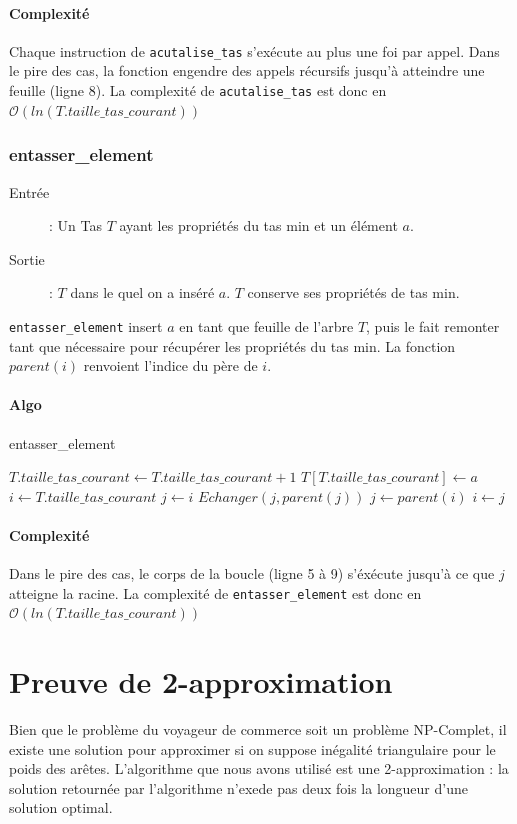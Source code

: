 \documentclass[a4paper,11pt]{article}
\begin{document}
\paragraph*{Complexité}
Chaque instruction de \texttt{acutalise\_tas} s’exécute au plus une foi par appel. Dans le pire des cas, la fonction engendre des appels récursifs jusqu’à atteindre une feuille (ligne 8). La complexité de \texttt{acutalise\_tas} est donc en $\mathcal{O}(ln(T.taille\_tas\_courant))$
\subsubsection*{entasser\_element}
\begin{description}
\item[Entrée] :  Un \textsf{Tas} $T$ ayant les propriétés du tas min et un élément $a$.
\item[Sortie] :  $T$ dans le quel on a inséré $a$. $T$ conserve ses propriétés de tas min.
\end{description}
\texttt{entasser\_element} insert $a$ en tant que feuille de l'arbre $T$, puis le fait remonter tant que nécessaire pour récupérer les propriétés du tas min.
La fonction $parent(i)$ renvoient l'indice du père de $i$.
\paragraph*{Algo}
\begin{algorithm}
\caption{entasser\_element}
\begin{algorithmic}[1]
\STATE $T.taille\_tas\_courant \leftarrow T.taille\_tas\_courant + 1$
\STATE $T\left[T.taille\_tas\_courant\right] \leftarrow a$
\STATE $i \leftarrow T.taille\_tas\_courant$
\STATE $j \leftarrow i$
\STATE $Echanger(j, parent(j))$
\STATE $j \leftarrow parent(i)$
\STATE $i \leftarrow j$
\ENDWHILE
\end{algorithmic}
\end{algorithm}
\paragraph*{Complexité}
Dans le pire des cas, le corps de la boucle (ligne 5 à 9) s'éxécute jusqu'à ce que $j$ atteigne la racine. La complexité de \texttt{entasser\_element} est donc en $\mathcal{O}(ln(T.taille\_tas\_courant))$


\section{Preuve de 2-approximation} %
Bien que le problème du voyageur de commerce soit un problème NP-Complet, il existe une solution pour approximer si on suppose inégalité triangulaire pour le poids des arêtes. L'algorithme que nous avons utilisé est une 2-approximation : la solution retournée par l'algorithme n'exede pas deux fois la longueur d'une solution optimal.
\end{document}
